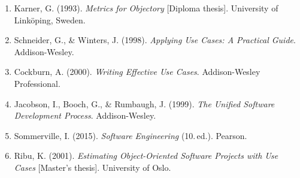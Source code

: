 \documentclass[11pt, a4paper]{article}
\begin{document}
\begin{enumerate}
    \item Karner, G. (1993). \textit{Metrics for Objectory} [Diploma thesis]. University of Linköping, Sweden.
    \item Schneider, G., \& Winters, J. (1998). \textit{Applying Use Cases: A Practical Guide}. Addison-Wesley.
    \item Cockburn, A. (2000). \textit{Writing Effective Use Cases}. Addison-Wesley Professional.
    \item Jacobson, I., Booch, G., \& Rumbaugh, J. (1999). \textit{The Unified Software Development Process}. Addison-Wesley.
    \item Sommerville, I. (2015). \textit{Software Engineering} (10.\textordfeminine\,ed.). Pearson.
    \item Ribu, K. (2001). \textit{Estimating Object-Oriented Software Projects with Use Cases} [Master's thesis]. University of Oslo.
\end{enumerate}
\end{document}
